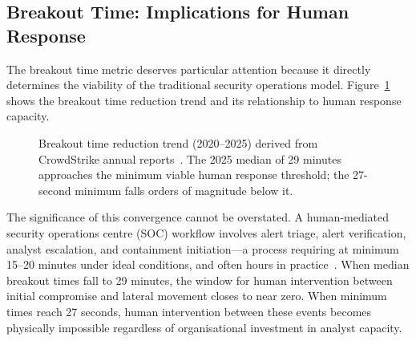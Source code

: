\documentclass[journal]{IEEEtran}
\begin{document}
\subsection{Breakout Time: Implications for Human Response}

The breakout time metric deserves particular attention because it directly determines
the viability of the traditional security operations model. Figure~\ref{fig:breakout}
shows the breakout time reduction trend and its relationship to human response
capacity.

\begin{figure}[h]
\centering
{}
\caption{Breakout time reduction trend (2020--2025) derived from CrowdStrike annual
  reports~\cite{cs2026press,cs2025gtr,itpro2026}. The 2025 median of 29 minutes
  approaches the minimum viable human response threshold; the 27-second minimum
  falls orders of magnitude below it.}
\label{fig:breakout}
\end{figure}

The significance of this convergence cannot be overstated. A human-mediated security
operations centre (SOC) workflow involves alert triage, alert verification, analyst
escalation, and containment initiation---a process requiring at minimum 15--20
minutes under ideal conditions, and often hours in practice~\cite{cs2026ransomware}.
When median breakout times fall to 29 minutes, the window for human intervention
between initial compromise and lateral movement closes to near zero. When minimum
times reach 27 seconds, human intervention between these events becomes physically
impossible regardless of organisational investment in analyst capacity.
\end{document}

